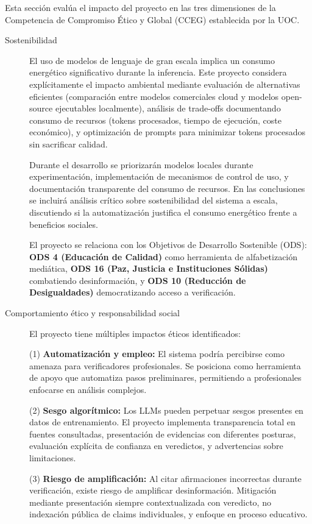 \documentclass[12pt,a4paper,twoside]{book}
\begin{document}
Esta sección evalúa el impacto del proyecto en las tres dimensiones de la Competencia de Compromiso Ético y Global (CCEG) establecida por la UOC.

\begin{description}
    \item[Sostenibilidad] El uso de modelos de lenguaje de gran escala implica un consumo energético significativo durante la inferencia. Este proyecto considera explícitamente el impacto ambiental mediante evaluación de alternativas eficientes (comparación entre modelos comerciales cloud y modelos open-source ejecutables localmente), análisis de trade-offs documentando consumo de recursos (tokens procesados, tiempo de ejecución, coste económico), y optimización de prompts para minimizar tokens procesados sin sacrificar calidad.

    Durante el desarrollo se priorizarán modelos locales durante experimentación, implementación de mecanismos de control de uso, y documentación transparente del consumo de recursos. En las conclusiones se incluirá análisis crítico sobre sostenibilidad del sistema a escala, discutiendo si la automatización justifica el consumo energético frente a beneficios sociales.

    El proyecto se relaciona con los Objetivos de Desarrollo Sostenible (ODS): \textbf{ODS 4 (Educación de Calidad)} como herramienta de alfabetización mediática, \textbf{ODS 16 (Paz, Justicia e Instituciones Sólidas)} combatiendo desinformación, y \textbf{ODS 10 (Reducción de Desigualdades)} democratizando acceso a verificación.

    \item[Comportamiento ético y responsabilidad social] El proyecto tiene múltiples impactos éticos identificados:

    (1) \textbf{Automatización y empleo:} El sistema podría percibirse como amenaza para verificadores profesionales. Se posiciona como herramienta de apoyo que automatiza pasos preliminares, permitiendo a profesionales enfocarse en análisis complejos.

    (2) \textbf{Sesgo algorítmico:} Los LLMs pueden perpetuar sesgos presentes en datos de entrenamiento. El proyecto implementa transparencia total en fuentes consultadas, presentación de evidencias con diferentes posturas, evaluación explícita de confianza en veredictos, y advertencias sobre limitaciones.

    (3) \textbf{Riesgo de amplificación:} Al citar afirmaciones incorrectas durante verificación, existe riesgo de amplificar desinformación. Mitigación mediante presentación siempre contextualizada con veredicto, no indexación pública de claims individuales, y enfoque en proceso educativo.


\end{description}
\end{document}
